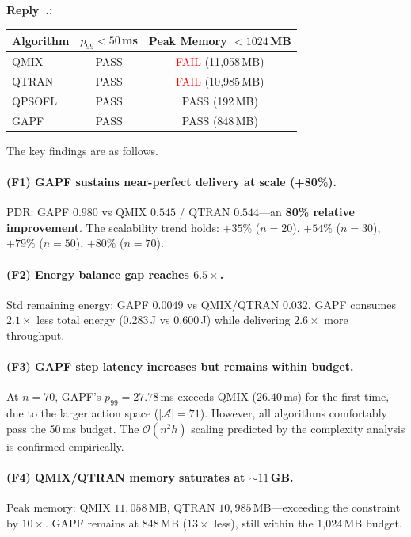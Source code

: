 \documentclass[11pt]{article}
\newcounter{reviewer}
\newcounter{replyctr}[reviewer]
\renewcommand{\thereplyctr}{\thereviewer.\arabic{replyctr}}
\newenvironment{reply}
  {\refstepcounter{replyctr}%
   \addtocounter{replyctr}{-1}%
   \medskip\noindent
   \begin{sf}\textbf{Reply~\thereplyctr:}\ }
  {\addtocounter{replyctr}{1}%
   \medskip\end{sf}}
\begin{document}
\begin{refsection}
\begin{mdframed}[style=Resp]
\begin{reply}
\begin{center}
\label{tab:constraints_n70_r35}
\begin{tabular}{lcc}
\toprule
Algorithm & $p_{99} < 50$\,ms & Peak Memory $< 1024$\,MB \\
\midrule
QMIX   & \textcolor{green!60!black}{PASS} & \textcolor{red}{FAIL} (11{,}058\,MB) \\
QTRAN  & \textcolor{green!60!black}{PASS} & \textcolor{red}{FAIL} (10{,}985\,MB) \\
QPSOFL & \textcolor{green!60!black}{PASS} & \textcolor{green!60!black}{PASS} (192\,MB) \\
GAPF   & \textcolor{green!60!black}{PASS} & \textcolor{green!60!black}{PASS} (848\,MB) \\
\bottomrule
\end{tabular}
\end{center}

The key findings are as follows.

\paragraph{(F1) GAPF sustains near-perfect delivery at scale (+80\%).}
PDR: GAPF $0.980$ vs QMIX $0.545$ / QTRAN $0.544$---an \textbf{80\% relative improvement}. The scalability trend holds: $+35\%$ ($n{=}20$), $+54\%$ ($n{=}30$), $+79\%$ ($n{=}50$), $+80\%$ ($n{=}70$).

\paragraph{(F2) Energy balance gap reaches $6.5\times$.}
Std remaining energy: GAPF $0.0049$ vs QMIX/QTRAN $0.032$. GAPF consumes $2.1\times$ less total energy ($0.283$\,J vs $0.600$\,J) while delivering $2.6\times$ more throughput.

\paragraph{(F3) GAPF step latency increases but remains within budget.}
At $n{=}70$, GAPF's $p_{99} = 27.78$\,ms exceeds QMIX ($26.40$\,ms) for the first time, due to the larger action space ($|\mathcal{A}| = 71$). However, all algorithms comfortably pass the 50\,ms budget. The $\mathcal{O}(n^2 h)$ scaling predicted by the complexity analysis is confirmed empirically.

\paragraph{(F4) QMIX/QTRAN memory saturates at ${\sim}11$\,GB.}
Peak memory: QMIX $11{,}058$\,MB, QTRAN $10{,}985$\,MB---exceeding the constraint by $10\times$. GAPF remains at $848$\,MB ($13\times$ less), still within the 1{,}024\,MB budget.


\end{reply}
\end{mdframed}
\end{refsection}
\end{document}

